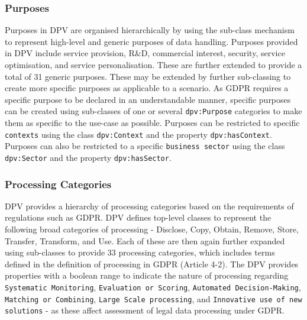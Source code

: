 \subsubsection{Purposes}
Purposes in DPV are organised hierarchically by using the sub-class mechanism to represent high-level and generic purposes of data handling.
Purposes provided in DPV include service provision, R\&D, commercial interest, security, service optimisation, and service personalisation. These are further extended to provide a total of 31 generic purposes.
These may be extended by further sub-classing to create more specific purposes as applicable to a scenario.
As GDPR requires a specific purpose to be declared in an understandable manner, specific purposes can be created using sub-classes of one or several \texttt{dpv:Purpose} categories to make them as specific to the use-case as possible.
 Purposes can be restricted to specific \texttt{contexts} using the class \texttt{dpv:Context} and the property \texttt{dpv:hasContext}.
Purposes can also be restricted to a specific \texttt{business sector} using the class \texttt{dpv:Sector} and the property \texttt{dpv:hasSector}.

\subsubsection{Processing Categories}
DPV provides a hierarchy of processing categories based on the requirements of regulations such as GDPR. 
DPV defines top-level classes to represent the following broad categories of processing - Disclose, Copy, Obtain, Remove, Store, Transfer, Transform, and Use.
Each of these are then again further expanded using sub-classes to provide 33 processing categories, which includes terms defined in the definition of processing in GDPR (Article 4-2).
The DPV provides properties with a boolean range to indicate the nature of processing regarding \texttt{Systematic Monitoring}, \texttt{Evaluation or Scoring}, \texttt{Automated Decision-Making}, \texttt{Matching or Combining}, \texttt{Large Scale processing}, and \texttt{Innovative use of new solutions} - as these affect assessment of legal data processing under GDPR.

